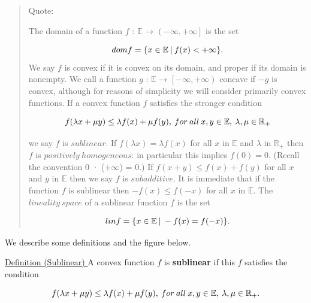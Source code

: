 \documentclass[a4paper,11pt]{jsarticle}
\begin{document}
\begin{quote}
  Quote:

  The domain of a function $f$ : $\mathbb{E}$ → $ \left ( -\infty ,+\infty \right ] $ is the set

  \begin{equation}
    dom f = \{x \in{\mathbb{E}}\:|\:f(x) < +\infty \}. \notag
  \end{equation}
  We say $f$ is convex if it is convex on its domain, and proper if its domain
  is nonempty. We call a function $g$ : $\mathbb{E}$ → $ \left [ -\infty ,+\infty \right ) $ concave if $-g$ is
  convex, although for reasons of simplicity we will consider primarily convex
  functions. If a convex function $f$ satisfies the stronger condition

  \begin{equation}
    f(\lambda x + \mu y) \leq \lambda f(x) + \mu f(y),\:for \:all\: x, y \in{\mathbb{E}},\: \lambda, \mu \in{\mathbb{R}}_+ \notag
  \end{equation}

  we say $f$ is $sublinear$. If $f(\lambda x) = \lambda f(x)$ for all $x$ in $\mathbb{E}$ and $\lambda$ in ${\mathbb{R}}_+$ then
  $f$ is $positively\:homogeneous$: in particular this implies $f(0) = 0$. (Recall the convention 0 · (+$\infty$) = 0.) If $ f(x + y) \leq f(x) +  f(y) $ for all $x$ and $y
$  in $\mathbb{E}$ then we say $f$ is $subadditive$. It is immediate that if the function $f$
  is sublinear then $-f(x) \leq f(-x)$ for all $x$ in $\mathbb{E}$. The $lineality\:space$ of a
  sublinear function $f$ is the set

  \begin{equation}
    lin f = \{x \in \mathbb{E}\:|\:-f(x) = f(-x)\}. \notag
  \end{equation}

\end{quote}

We describe some definitions and the figure below.

\begin{itembox}[l]{\underline{Definition (Sublinear) }}
  A convex function $f$ is \textbf{sublinear} if this $f$ satisfies the condition

  \begin{equation}
    f(\lambda x + \mu y) \leq \lambda f(x) + \mu f(y),\:for \:all\: x, y \in{\mathbb{E}},\: \lambda, \mu \in{\mathbb{R}}_+. \notag
  \end{equation}
\end{itembox}
\end{document}
